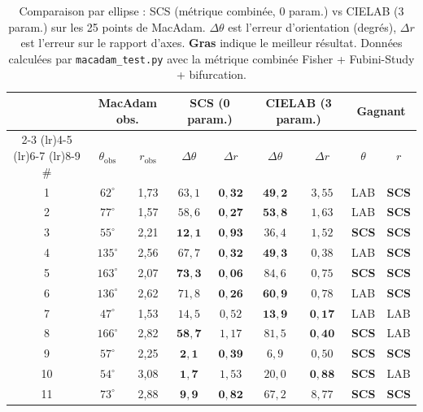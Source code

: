 \documentclass[12pt,a4paper]{article}
\begin{document}
\begin{table}[ht]
\centering
\caption{Comparaison par ellipse : SCS (m\'etrique combin\'ee, 0
param.) vs CIELAB (3 param.) sur les 25 points de MacAdam.
$\Delta\theta$ est l'erreur d'orientation (degr\'es), $\Delta r$ est
l'erreur sur le rapport d'axes. \textbf{Gras} indique le meilleur
r\'esultat. Donn\'ees calcul\'ees par \texttt{macadam\_test.py} avec la
m\'etrique combin\'ee Fisher + Fubini-Study + bifurcation.}
\label{tab:macadam}
\small
\begin{tabular}{ccccccccc}
\toprule
 & \multicolumn{2}{c}{MacAdam obs.} & \multicolumn{2}{c}{SCS (0 param.)} & \multicolumn{2}{c}{CIELAB (3 param.)} & \multicolumn{2}{c}{Gagnant} \\
\cmidrule(lr){2-3} \cmidrule(lr){4-5} \cmidrule(lr){6-7} \cmidrule(lr){8-9}
\# & $\theta_{\mathrm{obs}}$ & $r_{\mathrm{obs}}$ & $\Delta\theta$ & $\Delta r$ & $\Delta\theta$ & $\Delta r$ & $\theta$ & $r$ \\
\midrule
1  & $62^\circ$  & 1,73 & $63{,}1$ & $\mathbf{0{,}32}$ & $\mathbf{49{,}2}$ & $3{,}55$ & LAB & \textbf{SCS} \\
2  & $77^\circ$  & 1,57 & $58{,}6$ & $\mathbf{0{,}27}$ & $\mathbf{53{,}8}$ & $1{,}63$ & LAB & \textbf{SCS} \\
3  & $55^\circ$  & 2,21 & $\mathbf{12{,}1}$ & $\mathbf{0{,}93}$ & $36{,}4$ & $1{,}52$ & \textbf{SCS} & \textbf{SCS} \\
4  & $135^\circ$ & 2,56 & $67{,}7$ & $\mathbf{0{,}32}$ & $\mathbf{49{,}3}$ & $0{,}38$ & LAB & \textbf{SCS} \\
5  & $163^\circ$ & 2,07 & $\mathbf{73{,}3}$ & $\mathbf{0{,}06}$ & $84{,}6$ & $0{,}75$ & \textbf{SCS} & \textbf{SCS} \\
6  & $136^\circ$ & 2,62 & $71{,}8$ & $\mathbf{0{,}26}$ & $\mathbf{60{,}9}$ & $0{,}78$ & LAB & \textbf{SCS} \\
7  & $47^\circ$  & 1,53 & $14{,}5$ & $0{,}52$ & $\mathbf{13{,}9}$ & $\mathbf{0{,}17}$ & LAB & LAB \\
8  & $166^\circ$ & 2,82 & $\mathbf{58{,}7}$ & $1{,}17$ & $81{,}5$ & $\mathbf{0{,}40}$ & \textbf{SCS} & LAB \\
9  & $57^\circ$  & 2,25 & $\mathbf{2{,}1}$  & $\mathbf{0{,}39}$ & $6{,}9$  & $0{,}50$ & \textbf{SCS} & \textbf{SCS} \\
10 & $54^\circ$  & 3,08 & $\mathbf{1{,}7}$  & $1{,}53$ & $20{,}0$ & $\mathbf{0{,}88}$ & \textbf{SCS} & LAB \\
11 & $73^\circ$  & 2,88 & $\mathbf{9{,}9}$  & $\mathbf{0{,}82}$ & $67{,}2$ & $8{,}77$ & \textbf{SCS} & \textbf{SCS} \\

\end{tabular}
\end{table}
\end{document}
